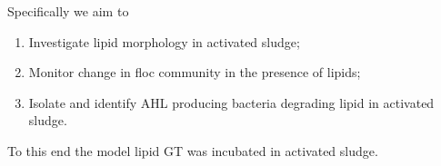 \documentclass[11pt]{article}
\begin{document}
\noindent
Specifically we aim to

\begin{enumerate}
\item Investigate lipid morphology in activated sludge;
\item Monitor change in floc community in the presence of lipids;
\item Isolate and identify AHL producing bacteria degrading lipid in activated sludge.
\end{enumerate}
To this end the model lipid GT was incubated in activated sludge.





\end{document}
